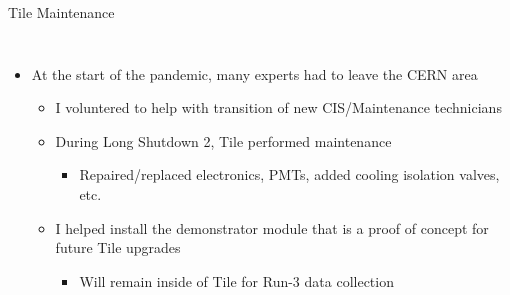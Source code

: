 \documentclass[aspectratio=169,xcolor=table]{beamer}
\begin{document}
    \begin{frame}[t]{Tile Maintenance}
      \begin{columns}
        \begin{itemize}
          \item At the start of the pandemic, many experts had to leave the CERN area
          \begin{itemize}
            \item I voluntered to help with transition of new CIS/Maintenance technicians
            \item During Long Shutdown 2, Tile performed maintenance 
            \begin{itemize}
              \item Repaired/replaced electronics, PMTs, added cooling isolation valves, etc.
            \end{itemize} 
            \item I helped install the demonstrator module that is a proof of concept for future Tile upgrades
              \begin{itemize}
                \item Will remain inside of Tile for Run-3 data collection
              \end{itemize}
          \end{itemize}
        \end{itemize}


\end{columns}
\end{frame}
\end{document}
